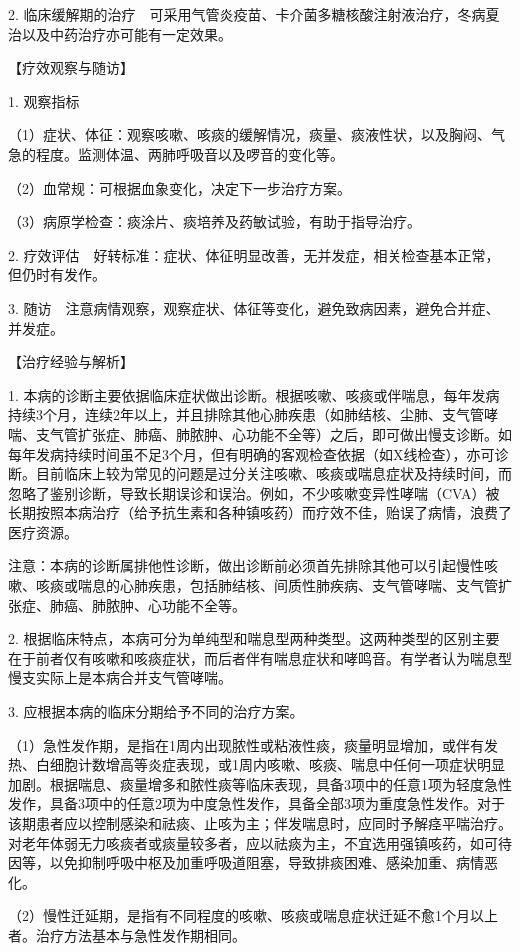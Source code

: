 2.
临床缓解期的治疗　可采用气管炎疫苗、卡介菌多糖核酸注射液治疗，冬病夏治以及中药治疗亦可能有一定效果。

【疗效观察与随访】

1. 观察指标

（1）症状、体征：观察咳嗽、咳痰的缓解情况，痰量、痰液性状，以及胸闷、气急的程度。监测体温、两肺呼吸音以及啰音的变化等。

（2）血常规：可根据血象变化，决定下一步治疗方案。

（3）病原学检查：痰涂片、痰培养及药敏试验，有助于指导治疗。

2.
疗效评估　好转标准：症状、体征明显改善，无并发症，相关检查基本正常，但仍时有发作。

3.
随访　注意病情观察，观察症状、体征等变化，避免致病因素，避免合并症、并发症。

【治疗经验与解析】

1.
本病的诊断主要依据临床症状做出诊断。根据咳嗽、咳痰或伴喘息，每年发病持续3个月，连续2年以上，并且排除其他心肺疾患（如肺结核、尘肺、支气管哮喘、支气管扩张症、肺癌、肺脓肿、心功能不全等）之后，即可做出慢支诊断。如每年发病持续时间虽不足3个月，但有明确的客观检查依据（如X线检查），亦可诊断。目前临床上较为常见的问题是过分关注咳嗽、咳痰或喘息症状及持续时间，而忽略了鉴别诊断，导致长期误诊和误治。例如，不少咳嗽变异性哮喘（CVA）被长期按照本病治疗（给予抗生素和各种镇咳药）而疗效不佳，贻误了病情，浪费了医疗资源。

注意：本病的诊断属排他性诊断，做出诊断前必须首先排除其他可以引起慢性咳嗽、咳痰或喘息的心肺疾患，包括肺结核、间质性肺疾病、支气管哮喘、支气管扩张症、肺癌、肺脓肿、心功能不全等。

2.
根据临床特点，本病可分为单纯型和喘息型两种类型。这两种类型的区别主要在于前者仅有咳嗽和咳痰症状，而后者伴有喘息症状和哮鸣音。有学者认为喘息型慢支实际上是本病合并支气管哮喘。

3. 应根据本病的临床分期给予不同的治疗方案。

（1）急性发作期，是指在1周内出现脓性或粘液性痰，痰量明显增加，或伴有发热、白细胞计数增高等炎症表现，或1周内咳嗽、咳痰、喘息中任何一项症状明显加剧。根据喘息、痰量增多和脓性痰等临床表现，具备3项中的任意1项为轻度急性发作，具备3项中的任意2项为中度急性发作，具备全部3项为重度急性发作。对于该期患者应以控制感染和祛痰、止咳为主；伴发喘息时，应同时予解痉平喘治疗。对老年体弱无力咳痰者或痰量较多者，应以祛痰为主，不宜选用强镇咳药，如可待因等，以免抑制呼吸中枢及加重呼吸道阻塞，导致排痰困难、感染加重、病情恶化。

（2）慢性迁延期，是指有不同程度的咳嗽、咳痰或喘息症状迁延不愈1个月以上者。治疗方法基本与急性发作期相同。

